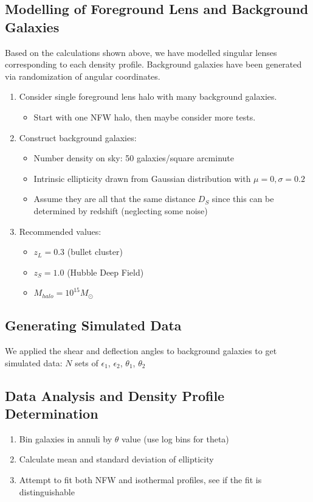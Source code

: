 \documentclass[10pt]{article}
\begin{document}
\subsection{Modelling of Foreground Lens and Background Galaxies}
Based on the calculations shown above, we have modelled singular lenses corresponding to each density profile.
 Background galaxies have been generated via randomization of angular coordinates.

\begin{enumerate}
    \item Consider single foreground lens halo with many background galaxies.
    \begin{itemize}
        \item Start with one NFW halo, then maybe consider more tests.
    \end{itemize}
    \item Construct background galaxies:
    \begin{itemize}
        \item Number density on sky: 50 galaxies/square arcminute
        \item Intrinsic ellipticity drawn from Gaussian distribution with $\mu=0, \sigma=0.2$
        \item Assume they are all that the same distance $D_S$ since this can be determined by redshift (neglecting some noise)
    \end{itemize}
    \item Recommended values:
    \begin{itemize}
        \item $z_L = 0.3$ (bullet cluster)
        \item $z_S = 1.0$ (Hubble Deep Field)
        \item $M_{halo} = 10^{15} M_\odot$
    \end{itemize}
\end{enumerate}

\subsection{Generating Simulated Data}
We applied the shear and deflection angles to background galaxies to get simulated data: $N$ sets of $\epsilon_1$, $\epsilon_2$, $\theta_1$, $\theta_2$


\subsection{Data Analysis and Density Profile Determination}
\begin{enumerate}
\item Bin galaxies in annuli by $\theta$ value (use log bins for theta)
\item Calculate mean and standard deviation of ellipticity
\item Attempt to fit both NFW and isothermal profiles, see if the fit is distinguishable
\end{enumerate}
\end{document}
